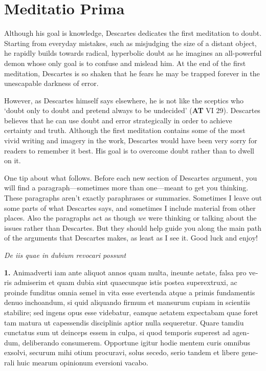 \chapter{Meditatio Prima}


Although his goal is knowledge, Descartes dedicates the first meditation to doubt. Starting from everyday mistakes, such as misjudging the size of a distant object, he rapidly builds towards radical, hyperbolic doubt as he imagines an all-powerful demon whose only goal is to confuse and mislead him. At the end of the first meditation, Descartes is so shaken that he fears he may be trapped forever in the unescapable darkness of error.

However, as Descartes himself says elsewhere, he is not like the sceptics who `doubt only to doubt and pretend always to be undecided' (\textbf{AT} VI 29). Descartes believes that he can use doubt and error strategically in order to achieve certainty and truth. Although the first meditation contains some of the most vivid writing and imagery in the work, Descartes would have been very sorry for readers to remember it best. His goal is to overcome doubt rather than to dwell on it.

One tip about what follows. Before each new section of Descartes argument, you will find a paragraph---sometimes more than one---meant to get you thinking. These paragraphs aren't exactly paraphrases or summaries. Sometimes I leave out some parts of what Descartes says, and sometimes I include material from other places. Also the paragraphs act as though \textit{we} were thinking or talking about the issues rather than Descartes. But they should help guide you along the main path of the arguments that Descartes makes, as least as I see it. Good luck and enjoy!

\clearpage

\begin{center}
    \beginnumbering
    \numberlinefalse
    \pstart
    \textit{De iis quae in dubium revocari possunt}
    \pend
    \endnumbering
\end{center}

\beginnumbering
\pstart
\begin{latin}
    \textenglish{\textbf{1.}} Animadverti iam ante aliquot annos quam multa, ineunte aetate, falsa pro veris admiserim et quam dubia sint quaecunque istis postea superextruxi, ac proinde funditus omnia semel in vita esse evertenda atque a primis fundamentis denuo inchoandum, si quid aliquando firmum et mansurum cupiam in scientiis stabilire; sed ingens opus esse videbatur, eamque aetatem expectabam quae foret tam matura ut capessendis disciplinis aptior nulla sequeretur. Quare tamdiu cunctatus sum ut deinceps essem in culpa, si quod temporis superest ad agendum, deliberando consumerem. Opportune igitur hodie mentem curis omnibus exsolvi, securum mihi otium procuravi, solus secedo, serio tandem et libere generali huic mearum opinionum eversioni vacabo.
\end{latin}
\pend
\endnumbering


